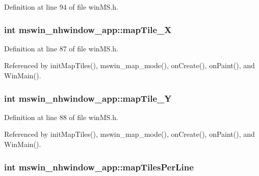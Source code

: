 Definition at line 94 of file win\+M\+S.\+h.

\hypertarget{structmswin__nhwindow__app_adb6d803036dca29b82a10f0fbd007edd}{
\subsubsection[{map\+Tile\+\_\+\+X}]{\setlength{\rightskip}{0pt plus 5cm}int mswin\+\_\+nhwindow\+\_\+app\+::map\+Tile\+\_\+\+X}}\label{structmswin__nhwindow__app_adb6d803036dca29b82a10f0fbd007edd}


Definition at line 87 of file win\+M\+S.\+h.



Referenced by init\+Map\+Tiles(), mswin\+\_\+map\+\_\+mode(), on\+Create(), on\+Paint(), and Win\+Main().

\hypertarget{structmswin__nhwindow__app_a699b7a92f8c907030eff6ef5a36d29f3}{
\subsubsection[{map\+Tile\+\_\+\+Y}]{\setlength{\rightskip}{0pt plus 5cm}int mswin\+\_\+nhwindow\+\_\+app\+::map\+Tile\+\_\+\+Y}}\label{structmswin__nhwindow__app_a699b7a92f8c907030eff6ef5a36d29f3}


Definition at line 88 of file win\+M\+S.\+h.



Referenced by init\+Map\+Tiles(), mswin\+\_\+map\+\_\+mode(), on\+Create(), on\+Paint(), and Win\+Main().

\hypertarget{structmswin__nhwindow__app_a7a89a59512a3bb56005832843339f479}{
\subsubsection[{map\+Tiles\+Per\+Line}]{\setlength{\rightskip}{0pt plus 5cm}int mswin\+\_\+nhwindow\+\_\+app\+::map\+Tiles\+Per\+Line}}\label{structmswin__nhwindow__app_a7a89a59512a3bb56005832843339f479}


